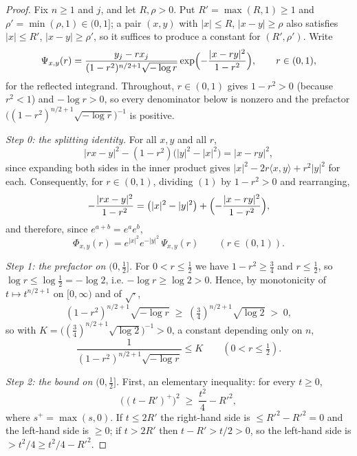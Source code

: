 \begin{proof}
Fix $n \geq 1$ and $j$, and let $R,\rho > 0$.  Put $R' = \max(R,1) \geq 1$ and
$\rho' = \min(\rho,1) \in (0,1]$; a pair $(x,y)$ with $|x| \leq R$, $|x-y| \geq \rho$ also
satisfies $|x| \leq R'$, $|x-y| \geq \rho'$, so it suffices to produce a constant for
$(R',\rho')$.  Write
\[
  \Psi_{x,y}(r)
    = \frac{y_j - r x_j}{(1-r^2)^{n/2+1}\sqrt{-\log r}}
      \exp\Bigl(-\frac{|x-ry|^2}{1-r^2}\Bigr) ,
  \qquad r \in (0,1) ,
\]
for the reflected integrand.  Throughout, $r \in (0,1)$ gives $1-r^2 > 0$ (because
$r^2 < 1$) and $-\log r > 0$, so every denominator below is nonzero and the prefactor
$\bigl((1-r^2)^{n/2+1}\sqrt{-\log r}\bigr)^{-1}$ is positive.

\emph{Step 0: the splitting identity.}
For all $x,y$ and all $r$,
\begin{equation*}
  |rx-y|^2 - (1-r^2)\bigl(|y|^2-|x|^2\bigr) = |x-ry|^2 , \tag{1}
\end{equation*}
since expanding both sides in the inner product gives
$|x|^2 - 2r\langle x,y\rangle + r^2|y|^2$ for each.  Consequently, for $r \in (0,1)$,
dividing $(1)$ by $1-r^2 > 0$ and rearranging,
\[
  -\frac{|rx-y|^2}{1-r^2}
    = \bigl(|x|^2 - |y|^2\bigr) + \Bigl(-\frac{|x-ry|^2}{1-r^2}\Bigr) ,
\]
and therefore, since $e^{a+b} = e^ae^b$,
\begin{equation*}
  \Phi_{x,y}(r) = e^{|x|^2}e^{-|y|^2}\,\Psi_{x,y}(r)
  \qquad (r \in (0,1)) . \tag{2}
\end{equation*}

\emph{Step 1: the prefactor on $(0,\tfrac12]$.}
For $0 < r \leq \tfrac12$ we have $1-r^2 \geq \tfrac34$ and $r \leq \tfrac12$, so
$\log r \leq \log\tfrac12 = -\log 2$, i.e. $-\log r \geq \log 2 > 0$.  Hence, by
monotonicity of $t \mapsto t^{n/2+1}$ on $[0,\infty)$ and of $\sqrt\cdot$,
\[
  (1-r^2)^{n/2+1}\sqrt{-\log r} \;\geq\; (\tfrac34)^{n/2+1}\sqrt{\log 2} \;>\; 0 ,
\]
so with $K = \bigl((\tfrac34)^{n/2+1}\sqrt{\log 2}\bigr)^{-1} > 0$, a constant depending
only on $n$,
\begin{equation*}
  \frac{1}{(1-r^2)^{n/2+1}\sqrt{-\log r}} \leq K
  \qquad (0 < r \leq \tfrac12) . \tag{3}
\end{equation*}

\emph{Step 2: the bound on $(0,\tfrac12]$.}
First, an elementary inequality: for every $t \geq 0$,
\begin{equation*}
  \bigl((t-R')^+\bigr)^2 \;\geq\; \frac{t^2}{4} - R'^2 , \tag{4}
\end{equation*}
where $s^+ = \max(s,0)$.  If $t \leq 2R'$ the right-hand side is $\leq R'^2-R'^2 = 0$ and
the left-hand side is $\geq 0$; if $t > 2R'$ then $t-R' > t/2 > 0$, so the left-hand side
is $> t^2/4 \geq t^2/4 - R'^2$.


\end{proof}
